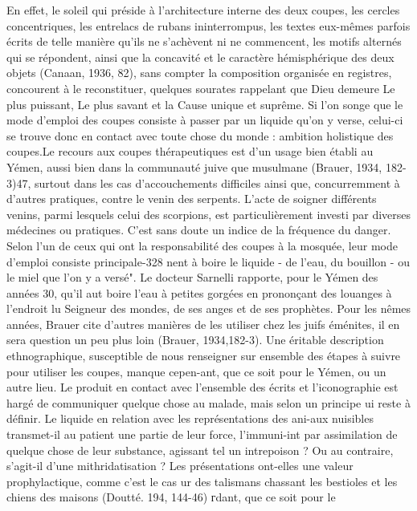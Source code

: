 En effet, le soleil qui préside à l'architecture interne des deux coupes, les cercles concentriques, les entrelacs de rubans ininterrompus, les textes eux-mêmes parfois écrits de telle manière qu'ils ne s'achèvent ni ne commencent, les motifs alternés qui se répondent, ainsi que la concavité et le caractère hémisphérique des deux objets (Canaan, 1936, 82), sans compter la composition organisée en registres, concourent à le reconstituer, quelques sourates rappelant que Dieu demeure Le plus puissant, Le plus savant et la Cause unique et suprême. Si l'on songe que le mode d'emploi des coupes consiste à passer par un liquide qu'on y verse, celui-ci se trouve donc en contact avec toute chose du monde : ambition holistique des coupes.Le recours aux coupes thérapeutiques est d'un usage bien établi au
Yémen, aussi bien dans la communauté juive que musulmane (Brauer, 1934, 182-3)47, surtout dans les cas d'accouchements difficiles ainsi que, concurremment à d'autres pratiques, contre le venin des serpents. L'acte de soigner différents venins, parmi lesquels celui des scorpions, est particulièrement investi par diverses médecines ou pratiques. C'est sans doute un indice de la fréquence du danger. Selon l'un de ceux qui ont la responsabilité des coupes à la mosquée, leur mode d'emploi consiste principale-328
nent à boire le liquide - de l'eau, du bouillon - ou le miel que l'on y a versé". Le docteur Sarnelli rapporte, pour le Yémen des années 30, qu'il aut boire l'eau à petites gorgées en prononçant des louanges à l'endroit lu Seigneur des mondes, de ses anges et de ses prophètes. Pour les nêmes années, Brauer cite d'autres manières de les utiliser chez les juifs éménites, il en sera question un peu plus loin (Brauer, 1934,182-3). Une éritable description ethnographique, susceptible de nous renseigner sur ensemble des étapes à suivre pour utiliser les coupes, manque cepen-ant, que ce soit pour le Yémen, ou un autre lieu.
Le produit en contact avec l'ensemble des écrits et l'iconographie est hargé de communiquer quelque chose au malade, mais selon un principe ui reste à définir. Le liquide en relation avec les représentations des ani-aux nuisibles transmet-il au patient une partie de leur force, l'immuni-int par assimilation de quelque chose de leur substance, agissant tel un intrepoison ? Ou au contraire, s'agit-il d'une mithridatisation ? Les présentations ont-elles une valeur prophylactique, comme c'est le cas ur des talismans chassant les bestioles et les chiens des maisons (Doutté.
194, 144-46) гdant, que ce soit pour le
